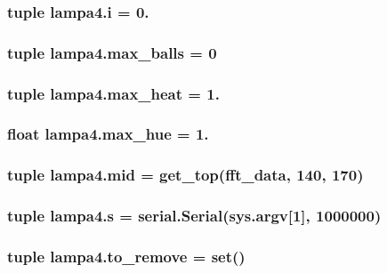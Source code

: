 \subsubsection[{i}]{\setlength{\rightskip}{0pt plus 5cm}tuple lampa4.\+i = 0.}\label{namespacelampa4_aa1a8ba53cf446fec1b46e2dc8a9dcf15}
\hypertarget{namespacelampa4_a95eb3600d592e7afc11601b525431042}{}
\subsubsection[{max\+\_\+balls}]{\setlength{\rightskip}{0pt plus 5cm}tuple lampa4.\+max\+\_\+balls = 0}\label{namespacelampa4_a95eb3600d592e7afc11601b525431042}
\hypertarget{namespacelampa4_abef701f3b350dc684c18349419f0d6f3}{}
\subsubsection[{max\+\_\+heat}]{\setlength{\rightskip}{0pt plus 5cm}tuple lampa4.\+max\+\_\+heat = 1.}\label{namespacelampa4_abef701f3b350dc684c18349419f0d6f3}
\hypertarget{namespacelampa4_ab7c57ff13fd458647c91f06273313483}{}
\subsubsection[{max\+\_\+hue}]{\setlength{\rightskip}{0pt plus 5cm}float lampa4.\+max\+\_\+hue = 1.}\label{namespacelampa4_ab7c57ff13fd458647c91f06273313483}
\hypertarget{namespacelampa4_a67965ded9d0d78e4f7e769861b4960d6}{}
\subsubsection[{mid}]{\setlength{\rightskip}{0pt plus 5cm}tuple lampa4.\+mid = {\bf get\+\_\+top}({\bf fft\+\_\+data}, 140, 170)}\label{namespacelampa4_a67965ded9d0d78e4f7e769861b4960d6}
\hypertarget{namespacelampa4_afcee0cb8e2f362c76be874971642e643}{}
\subsubsection[{s}]{\setlength{\rightskip}{0pt plus 5cm}tuple lampa4.\+s = serial.\+Serial(sys.\+argv\mbox{[}1\mbox{]}, 1000000)}\label{namespacelampa4_afcee0cb8e2f362c76be874971642e643}
\hypertarget{namespacelampa4_a12e9ce59aed9709c1a7681120d90ef56}{}
\subsubsection[{to\+\_\+remove}]{\setlength{\rightskip}{0pt plus 5cm}tuple lampa4.\+to\+\_\+remove = set()}\label{namespacelampa4_a12e9ce59aed9709c1a7681120d90ef56}
